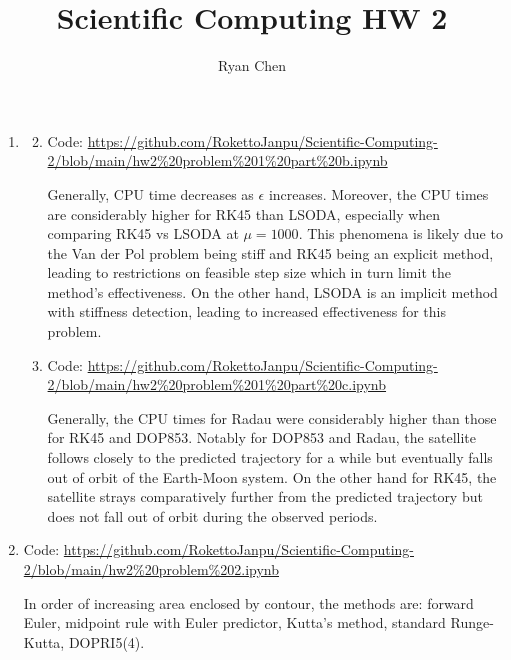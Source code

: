 \documentclass{article}
\title{Scientific Computing HW 2}
\author{Ryan Chen}
\newcommand{\ep}{\epsilon}
\begin{document}
	
\maketitle



\begin{enumerate}
	
	
	
\item

\begin{enumerate}[label=(\alph*)]\setcounter{enumi}{1}
	
	\item Code: \url{https://github.com/RokettoJanpu/Scientific-Computing-2/blob/main/hw2%20problem%201%20part%20b.ipynb}
	
	Generally, CPU time decreases as $\ep$ increases. Moreover, the CPU times are considerably higher for RK45 than LSODA, especially when comparing RK45 vs LSODA at $\mu=1000$. This phenomena is likely due to the Van der Pol problem being stiff and RK45 being an explicit method, leading to restrictions on feasible step size which in turn limit the method's effectiveness. On the other hand, LSODA is an implicit method with stiffness detection, leading to increased effectiveness for this problem.
	
	\item Code: \url{https://github.com/RokettoJanpu/Scientific-Computing-2/blob/main/hw2%20problem%201%20part%20c.ipynb}
	
	Generally, the CPU times for Radau were considerably higher than those for RK45 and DOP853. Notably for DOP853 and Radau, the satellite follows closely to the predicted trajectory for a while but eventually falls out of orbit of the Earth-Moon system. On the other hand for RK45, the satellite strays comparatively further from the predicted trajectory but does not fall out of orbit during the observed periods.
	
\end{enumerate}



\item Code: \url{https://github.com/RokettoJanpu/Scientific-Computing-2/blob/main/hw2%20problem%202.ipynb}

In order of increasing area enclosed by contour, the methods are: forward Euler, midpoint rule with Euler predictor, Kutta's method, standard Runge-Kutta, DOPRI5(4).


\end{enumerate}
\end{document}
